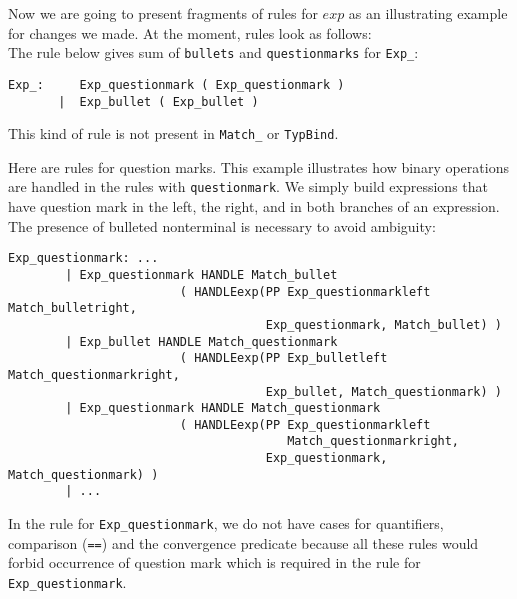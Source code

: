 Now we are going to present fragments of rules for $exp$ as an
illustrating example for changes we made. At the moment, rules look as
follows:\\

The rule below gives sum of {\tt bullets} and {\tt questionmarks} for
{\tt Exp\_}: {\small
\begin{verbatim}
Exp_:     Exp_questionmark ( Exp_questionmark )
       |  Exp_bullet ( Exp_bullet )
\end{verbatim}}
\noindent This kind of rule is not present in {\tt Match\_} or {\tt TypBind}.

Here are rules for question marks. This example illustrates how binary
operations are handled in the rules with {\tt questionmark}. We simply
build expressions that have question mark in the left, the right, and
in both branches of an expression. The presence of bulleted
nonterminal is necessary to avoid ambiguity: {\small
\begin{verbatim}
Exp_questionmark: ...
        | Exp_questionmark HANDLE Match_bullet
                        ( HANDLEexp(PP Exp_questionmarkleft Match_bulletright, 
                                    Exp_questionmark, Match_bullet) )
        | Exp_bullet HANDLE Match_questionmark 
                        ( HANDLEexp(PP Exp_bulletleft Match_questionmarkright, 
                                    Exp_bullet, Match_questionmark) )
        | Exp_questionmark HANDLE Match_questionmark
                        ( HANDLEexp(PP Exp_questionmarkleft 
                                       Match_questionmarkright, 
                                    Exp_questionmark, Match_questionmark) )
        | ...
\end{verbatim}}
  \noindent In the rule for {\tt Exp\_questionmark}, we do not have
  cases for quantifiers, comparison ({\tt ==}) and the convergence
  predicate because all these rules would forbid occurrence of
  question mark which is required in the rule for {\tt
  Exp\_questionmark}.

